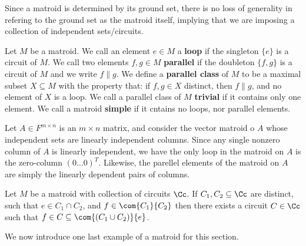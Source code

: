 Since a matroid is determined by its ground set, there is no loss of generality
in refering to the ground set as the matroid itself, implying that we are
imposing a collection of independent sets/circuits.

\begin{definition}
    Let $M$ be a matroid. We call an element $e \in M$ a  \textbf{loop} if the
    singleton $\{e\}$ is a circuit of $M$. We call two elements  $f,g \in M$
     \textbf{parallel} if the doubleton $\{f,g\}$ is a circuit of $M$ and we
     write  $f\|g$. We define a \textbf{parallel class} of $M$ to be a maximal
     subset  $X \subseteq M$ with the property that: if  $f,g \in X$ distinct,
     then $f\|g$, and no element of  $X$ is a loop. We call a parallel class of
     $M$  \textbf{trivial} if it contains only one element. We call a matroid
     \textbf{simple} if it cntains no loops, nor parallel elements.
\end{definition}

\begin{example}\label{1.7}
    Let $A \in F^{m \times n}$ is an $m \times n$ matrix, and consider the
    vector matroid o $A$ whose independent sets are linearly independent
    columns. Since any single nonzero column of  $A$ is linearly independent, we
    have the only loop in the matroid on  $A$ is the zero-column
    $(0 \dots 0)^T$. Likewise, the parellel elements of the matroid on $A$ are
    simply the linearly dependent pairs of columns.
\end{example}

\begin{theorem}\label{1.1.5}
    Let $M$ be a matroid with collection of circuits  $\Cc$. If  $C_1, C_2
    \subseteq \Cc$ are distinct, such that $e \in C_1 \cap C_2$, and $f \in
    \com{C_1}{C_2}$ then there exists a circuit $C \in \Cc$ such that  $f \in C
    \subseteq \com{(C_1 \cup C_2)}{e}$.
\end{theorem}

We now introduce one last example of a matroid for this section.


